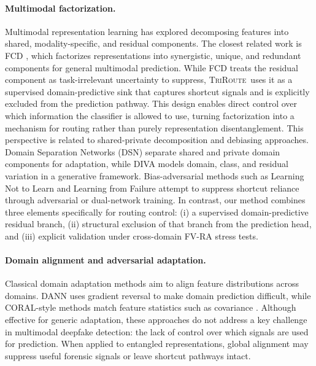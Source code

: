 \documentclass{article}
\newcommand{\method}{\textsc{TriRoute}}
\begin{document}
\paragraph{Multimodal factorization.}
Multimodal representation learning has explored decomposing features into shared, modality-specific, and residual components. The closest related work is FCD \citep{liu2025fcd}, which factorizes representations into synergistic, unique, and redundant components for general multimodal prediction. 
While FCD treats the residual component as task-irrelevant uncertainty to suppress, \method\ uses it as a supervised domain-predictive sink that captures shortcut signals and is explicitly excluded from the prediction pathway. This design enables direct control over which information the classifier is allowed to use, turning factorization into a mechanism for routing rather than purely representation disentanglement.
This perspective is related to shared-private decomposition and debiasing approaches. Domain Separation Networks (DSN) \citep{bousmalis2016dsn} separate shared and private domain components for adaptation, while DIVA \citep{ilse2019diva} models domain, class, and residual variation in a generative framework. Bias-adversarial methods such as Learning Not to Learn \citep{kim2019learningnottolearn} and Learning from Failure \citep{nam2020learningfromfailure} attempt to suppress shortcut reliance through adversarial or dual-network training. 
In contrast, our method combines three elements specifically for routing control: (i) a supervised domain-predictive residual branch, (ii) structural exclusion of that branch from the prediction head, and (iii) explicit validation under cross-domain FV-RA stress tests.

\paragraph{Domain alignment and adversarial adaptation.}
Classical domain adaptation methods aim to align feature distributions across domains. DANN \citep{ganin2016dann} uses gradient reversal to make domain prediction difficult, while CORAL-style methods match feature statistics such as covariance \citep{sun2016deepcoral}. 
Although effective for generic adaptation, these approaches do not address a key challenge in multimodal deepfake detection: the lack of control over which signals are used for prediction. When applied to entangled representations, global alignment may suppress useful forensic signals or leave shortcut pathways intact. 
\end{document}
